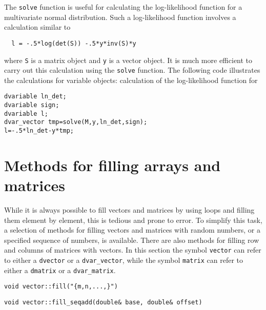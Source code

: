 \documentclass{admbmanual}
\begin{document}
The \texttt{solve} function is useful for calculating the log-likelihood
function for a multivariate normal distribution. Such a log-likelihood function
involves a calculation similar to
\begin{lstlisting}
  l = -.5*log(det(S)) -.5*y*inv(S)*y
\end{lstlisting}
where \texttt{S} is a matrix object and \texttt{y} is a vector object. It is
much more efficient to carry out this calculation using the \texttt{solve}
function. The following code illustrates the calculations for variable objects:
%
{calculation of the log-likelihood function for}
\begin{lstlisting}
dvariable ln_det;
dvariable sign;
dvariable l;
dvar_vector tmp=solve(M,y,ln_det,sign);
l=-.5*ln_det-y*tmp;
\end{lstlisting}

\section{Methods for filling arrays and matrices}

While it is always possible to fill vectors and matrices by using loops and
filling them element by element, this is tedious and prone to error. To simplify
this task, a selection of methods for filling vectors and matrices with random
numbers, or a specified sequence of numbers, is available. There are also
methods for filling row and columns of matrices with vectors. In this section
the symbol \texttt{vector} can refer to either a \texttt{dvector} or a
\texttt{dvar\_vector}, while the symbol \texttt{matrix} can refer to either a
\texttt{dmatrix} or a \texttt{dvar\_matrix}.

\begin{lstlisting}
void vector::fill("{m,n,...,}")
\end{lstlisting}

\begin{lstlisting}
void vector::fill_seqadd(double& base, double& offset)
\end{lstlisting}
\end{document}
